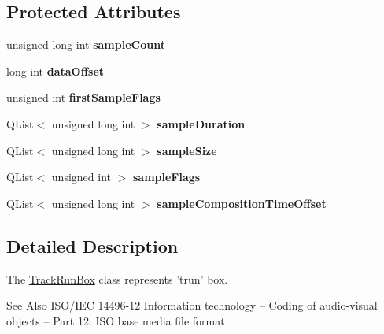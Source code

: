 \subsection*{Protected Attributes}
\begin{DoxyCompactItemize}
\item 
\hypertarget{class_track_run_box_a0c7c7a1d046f9fd6a02a636a156f323d}{unsigned long int {\bfseries sample\-Count}}\label{class_track_run_box_a0c7c7a1d046f9fd6a02a636a156f323d}

\item 
\hypertarget{class_track_run_box_a8b699a95687b00bca377ac4d47174fb5}{long int {\bfseries data\-Offset}}\label{class_track_run_box_a8b699a95687b00bca377ac4d47174fb5}

\item 
\hypertarget{class_track_run_box_a0e643cd47b1c65e2f583a9cc0fac6e63}{unsigned int {\bfseries first\-Sample\-Flags}}\label{class_track_run_box_a0e643cd47b1c65e2f583a9cc0fac6e63}

\item 
\hypertarget{class_track_run_box_ab5d9c8d5c8fc71c3095666a3a4e29aa8}{Q\-List$<$ unsigned long int $>$ {\bfseries sample\-Duration}}\label{class_track_run_box_ab5d9c8d5c8fc71c3095666a3a4e29aa8}

\item 
\hypertarget{class_track_run_box_a70b45065808669382557902eeda9ff90}{Q\-List$<$ unsigned long int $>$ {\bfseries sample\-Size}}\label{class_track_run_box_a70b45065808669382557902eeda9ff90}

\item 
\hypertarget{class_track_run_box_a78ebb3f90e5a749f7ff3e43e5d5fef36}{Q\-List$<$ unsigned int $>$ {\bfseries sample\-Flags}}\label{class_track_run_box_a78ebb3f90e5a749f7ff3e43e5d5fef36}

\item 
\hypertarget{class_track_run_box_a25601a6da40f69d7765376a8f12472b1}{Q\-List$<$ unsigned long int $>$ {\bfseries sample\-Composition\-Time\-Offset}}\label{class_track_run_box_a25601a6da40f69d7765376a8f12472b1}

\end{DoxyCompactItemize}


\subsection{Detailed Description}
The \hyperlink{class_track_run_box}{Track\-Run\-Box} class represents 'trun' box. 

\begin{DoxySeeAlso}{See Also}
I\-S\-O/\-I\-E\-C 14496-\/12 Information technology – Coding of audio-\/visual objects – Part 12\-: I\-S\-O base media file format 
\end{DoxySeeAlso}


